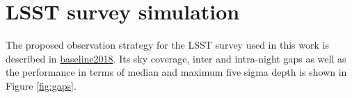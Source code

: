 %
\section{LSST survey simulation} \label{sec:lsstss}
The proposed observation strategy for the \gls{LSST} survey used in this work is described in \href{http://astro-lsst-01.astro.washington.edu:8080/multiColor?runId=1#Fivesigmadepth}{baseline2018}. Its sky coverage, inter and intra-night gaps as well as the performance in terms of median and maximum five sigma depth is shown in Figure \ref{fig:gaps}. 

